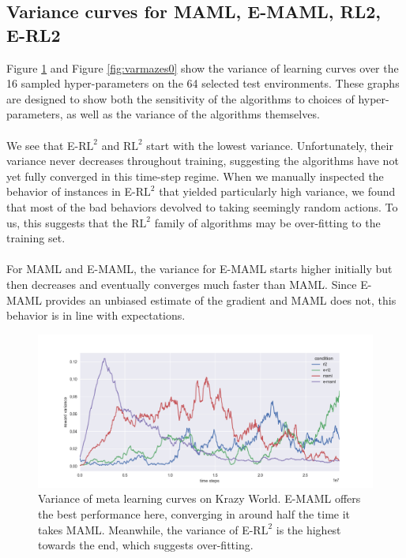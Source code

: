 \documentclass{article} %
\begin{document}
\subsection{Variance curves for MAML, E-MAML, RL2, E-RL2}

Figure \ref{fig:vargrids0} and Figure \ref{fig:varmazes0} show the variance of learning curves over the 16 sampled hyper-parameters on the 64 selected test environments. These graphs are designed to show both the sensitivity of the algorithms to choices of hyper-parameters, as well as the variance of the algorithms themselves. \\
\\
We see that E-$\text{RL}^2$ and $\text{RL}^2$ start with the lowest variance. Unfortunately, their variance never decreases throughout training, suggesting the algorithms have not yet fully converged in this time-step regime. When we manually inspected the behavior of instances in E-$\text{RL}^2$ that yielded particularly high variance, we found that most of the bad behaviors devolved to taking seemingly random actions. To us, this suggests that the $\text{RL}^2$ family of algorithms may be over-fitting to the training set. \\
\\
For MAML and E-MAML, the variance for E-MAML starts higher initially but then decreases and eventually converges much faster than MAML. Since E-MAML provides an unbiased estimate of the gradient and MAML does not, this behavior is in line with expectations. 
\begin{figure}[H]
\begin{center}
\includegraphics[scale=0.4]{bradly_curves/64testgridvar0.png} 
\end{center}
\caption{Variance of meta learning curves on Krazy World. E-MAML offers the best performance here, converging in around half the time it takes MAML. Meanwhile, the variance of E-$\text{RL}^2$ is the highest towards the end, which suggests over-fitting.}
\label{fig:vargrids0}
\end{figure} 
\end{document}
